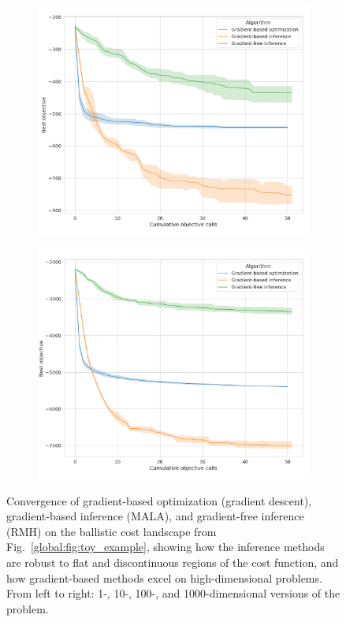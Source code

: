 \begin{figure}[tb]
    \begin{subfigure}[t]{0.24\linewidth}
        \centering
        \includegraphics[width=\linewidth]{images/global_methods/ballistic_100.png}
    \end{subfigure}
    \begin{subfigure}[t]{0.24\linewidth}
        \centering
        \includegraphics[width=\linewidth]{images/global_methods/ballistic_1000.png}
    \end{subfigure}
    \caption{Convergence of gradient-based optimization (gradient descent), gradient-based inference (MALA), and gradient-free inference (RMH) on the ballistic cost landscape from Fig.~\ref{global:fig:toy_example}, showing how the inference methods are robust to flat and discontinuous regions of the cost function, and how gradient-based methods excel on high-dimensional problems. From left to right: 1-, 10-, 100-, and 1000-dimensional versions of the problem.}
    \label{global:fig:ballistic_convergence}
\end{figure}

